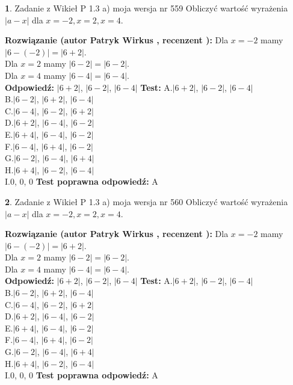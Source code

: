 \documentclass[12pt, a4paper]{article}
\theoremstyle{definition} %
\newtheorem{zad}{}
\newcommand{\zadStart}[1]{\begin{zad}#1\newline}
\newcommand{\zadStop}{\end{zad}}
\newcommand{\rozwStart}[2]{\noindent \textbf{Rozwiązanie (autor #1 , recenzent #2): }\newline}
\newcommand{\rozwStop}{\newline}
\newcommand{\odpStart}{\noindent \textbf{Odpowiedź:}\newline}
\newcommand{\odpStop}{\newline}
\newcommand{\testStart}{\noindent \textbf{Test:}\newline}
\newcommand{\testStop}{\newline}
\newcommand{\kluczStart}{\noindent \textbf{Test poprawna odpowiedź:}\newline}
\newcommand{\kluczStop}{\newline}
\begin{document}
\zadStart{Zadanie z Wikieł P 1.3 a) moja wersja nr 559}
Obliczyć wartość wyrażenia $|a - x|$ dla $x=-2,x=2,x=4$.
\zadStop
\rozwStart{Patryk Wirkus}{}
Dla $x = -2$ mamy $|6 - (-2)| = |6 + 2|$.\\
Dla $x = 2$ mamy $|6 - 2| = |6 - 2|$.\\
Dla $x = 4$ mamy $|6 - 4| = |6 - 4|$.\\
\rozwStop
\odpStart
$|6 + 2|$, $|6 - 2|$, $|6 - 4|$
\odpStop
\testStart
A.$|6 + 2|$, $|6 - 2|$, $|6 - 4|$\\
B.$|6 - 2|$, $|6 + 2|$, $|6 - 4|$\\
C.$|6 - 4|$, $|6 - 2|$, $|6 + 2|$\\
D.$|6 + 2|$, $|6 - 4|$, $|6 - 2|$\\
E.$|6 + 4|$, $|6 - 4|$, $|6 - 2|$\\
F.$|6 - 4|$, $|6 + 4|$, $|6 - 2|$\\
G.$|6 - 2|$, $|6 - 4|$, $|6 + 4|$\\
H.$|6 + 4|$, $|6 - 2|$, $|6 - 4|$\\
I.$0$, $0$, $0$
\testStop
\kluczStart
A
\kluczStop



\zadStart{Zadanie z Wikieł P 1.3 a) moja wersja nr 560}
Obliczyć wartość wyrażenia $|a - x|$ dla $x=-2,x=2,x=4$.
\zadStop
\rozwStart{Patryk Wirkus}{}
Dla $x = -2$ mamy $|6 - (-2)| = |6 + 2|$.\\
Dla $x = 2$ mamy $|6 - 2| = |6 - 2|$.\\
Dla $x = 4$ mamy $|6 - 4| = |6 - 4|$.\\
\rozwStop
\odpStart
$|6 + 2|$, $|6 - 2|$, $|6 - 4|$
\odpStop
\testStart
A.$|6 + 2|$, $|6 - 2|$, $|6 - 4|$\\
B.$|6 - 2|$, $|6 + 2|$, $|6 - 4|$\\
C.$|6 - 4|$, $|6 - 2|$, $|6 + 2|$\\
D.$|6 + 2|$, $|6 - 4|$, $|6 - 2|$\\
E.$|6 + 4|$, $|6 - 4|$, $|6 - 2|$\\
F.$|6 - 4|$, $|6 + 4|$, $|6 - 2|$\\
G.$|6 - 2|$, $|6 - 4|$, $|6 + 4|$\\
H.$|6 + 4|$, $|6 - 2|$, $|6 - 4|$\\
I.$0$, $0$, $0$
\testStop
\kluczStart
A
\kluczStop
\end{document}
